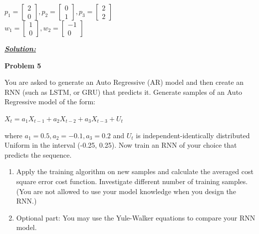 \documentclass{article}
\begin{document}
\begin{center}
    $p_1 = \begin{bmatrix}
        2\\
        0
      \end{bmatrix}, p_2 = \begin{bmatrix}
        0\\
        1
      \end{bmatrix}, p_3 = \begin{bmatrix}
        2\\
        2
      \end{bmatrix}$\\
      \vspace{1cm}
      $w_1 = \begin{bmatrix}
        1\\
        0
      \end{bmatrix}, w_2 = \begin{bmatrix}
        -1\\
        0
      \end{bmatrix}$
      \vspace{1cm}

\end{center}

\noindent \underline{\textbf{\textit{Solution:}}}


\newpage
\noindent \textbf{Problem 5}

\noindent You are asked to generate an Auto Regressive (AR) model and then create an RNN (such 
as LSTM, or GRU) that predicts it. Generate samples of an Auto Regressive model of 
the form: 
\begin{center}
    $X_t = a_1X_{t-1} + a_2X_{t-2} + a_3X_{t-3} + U_t$
    
\end{center}
where $a_1= 0.5, a_2= -0.1, a_3= 0.2$ and $U_t$ is independent-identically distributed Uniform in 
the interval (-0.25, 0.25). Now train an RNN of your choice that predicts the sequence. 

\begin{enumerate} [label=\Alph*]
    \item Apply the training algorithm on new samples and calculate the averaged cost square 
    error cost function. Investigate different number of training samples. (You are not 
    allowed to use your model knowledge when you design the RNN.)
    \item Optional part: You may use the Yule-Walker equations to compare your RNN 
    model. 
    
\end{enumerate}
\end{document}
